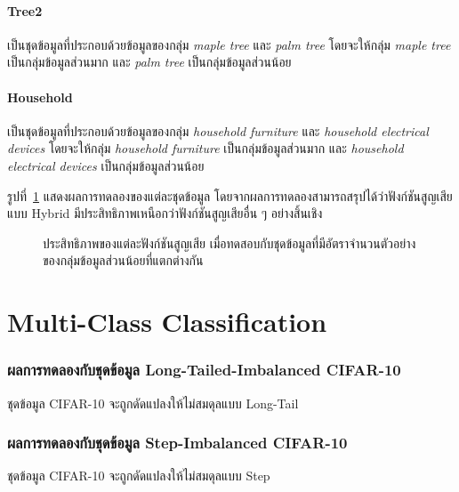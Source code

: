 \paragraph{Tree2}
เป็นชุดข้อมูลที่ประกอบด้วยข้อมูลของกลุ่ม \emph{maple tree} และ \emph{palm tree} โดยจะให้กลุ่ม \emph{maple tree} เป็นกลุ่มข้อมูลส่วนมาก และ \emph{palm tree} เป็นกลุ่มข้อมูลส่วนน้อย

\paragraph{Household}
เป็นชุดข้อมูลที่ประกอบด้วยข้อมูลของกลุ่ม \emph{household furniture} และ \emph{household electrical devices} โดยจะให้กลุ่ม \emph{household furniture} เป็นกลุ่มข้อมูลส่วนมาก และ \emph{household electrical devices} เป็นกลุ่มข้อมูลส่วนน้อย

รูปที่~\ref{fig:result-cifar100} แสดงผลการทดลองของแต่ละชุดข้อมูล โดยจากผลการทดลองสามารถสรุปได้ว่าฟังก์ชันสูญเสียแบบ Hybrid มีประสิทธิภาพเหนือกว่าฟังก์ชันสูญเสียอื่น ๆ อย่างสิ้นเชิง

\begin{figure}[h]
  \centering
  \caption{ประสิทธิภาพของแต่ละฟังก์ชันสูญเสีย เมื่อทดสอบกับชุดข้อมูลที่มีอัตราจำนวนตัวอย่างของกลุ่มข้อมูลส่วนน้อยที่แตกต่างกัน}
  \label{fig:result-cifar100}
\end{figure}
\FloatBarrier

\label{ex:cifar-100}
\section{Multi-Class Classification}
\subsubsection{ผลการทดลองกับชุดข้อมูล Long-Tailed-Imbalanced CIFAR-10}
ชุดข้อมูล CIFAR-10 จะถูกดัดแปลงให้ไม่สมดุลแบบ Long-Tail
\label{ex:long-tailed-cifar-10}
\subsubsection{ผลการทดลองกับชุดข้อมูล Step-Imbalanced CIFAR-10}
ชุดข้อมูล CIFAR-10 จะถูกดัดแปลงให้ไม่สมดุลแบบ Step
\label{ex:step-cifar-100}